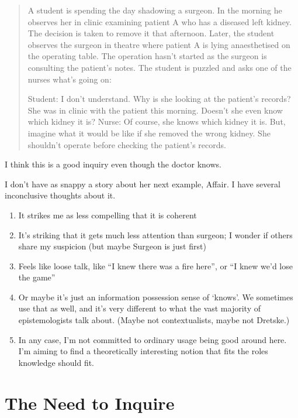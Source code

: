 \documentclass[
  11pt,
]{book}
\providecommand{\tightlist}{%
  \setlength{\itemsep}{0pt}\setlength{\parskip}{0pt}}
\begin{document}
\begin{quote}
A student is spending the day shadowing a surgeon. In the morning he observes her in clinic examining patient A who has a diseased left kidney. The decision is taken to remove it that afternoon. Later, the student observes the surgeon in theatre where patient A is lying anaesthetised on the operating table. The operation hasn't started as the surgeon is consulting the patient's notes. The student is puzzled and asks one of the nurses what's going on:

Student: I don't understand. Why is she looking at the patient's records? She was in clinic with the patient this morning. Doesn't she even know which kidney it is?
Nurse: Of course, she knows which kidney it is. But, imagine what it would be like if she removed the wrong kidney. She shouldn't operate before checking the patient's records.
\end{quote}

I think this is a good inquiry even though the doctor knows.

I don't have as snappy a story about her next example, Affair. I have several inconclusive thoughts about it.

\begin{enumerate}
\def\labelenumi{\arabic{enumi}.}
\tightlist
\item
  It strikes me as less compelling that it is coherent
\item
  It's striking that it gets much less attention than surgeon; I wonder if others share my suspicion (but maybe Surgeon is just first)
\item
  Feels like loose talk, like ``I knew there was a fire here'', or ``I knew we'd lose the game''
\item
  Or maybe it's just an information possession sense of `knows'. We sometimes use that as well, and it's very different to what the vast majority of epistemologists talk about. (Maybe not contextualists, maybe not Dretske.)
\item
  In any case, I'm not committed to ordinary usage being good around here. I'm aiming to find a theoretically interesting notion that fits the roles knowledge should fit.
\end{enumerate}

\hypertarget{need}{%
\section{The Need to Inquire}\label{need}}
\end{document}
